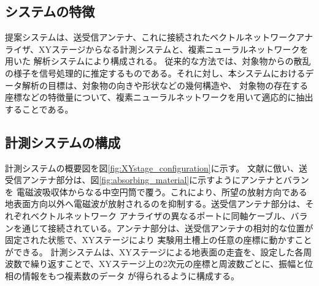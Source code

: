 \documentclass[11pt,a4paper,uplatex,draft]{ujarticle}
\begin{document}
  
  \subsection{システムの特徴}
    
    提案システムは、送受信アンテナ、これに接続されたベクトルネットワークアナライザ、XYステージからなる計測システムと、複素ニューラルネットワークを用いた
    解析システムにより構成される。
    従来的な方法では、対象物からの散乱の様子を信号処理的に推定するものである。それに対し、本システムにおけるデータ解析の目標は、対象物の向きや形状などの幾何構造や、
    対象物の存在する座標などの特徴量について、複素ニューラルネットワークを用いて適応的に抽出することである。

  \subsection{計測システムの構成}

    計測システムの概要図を図\ref{fig:XYstage_configuration}に示す。
    文献\cite{absorbing_material}に倣い、送受信アンテナ部分は、図\ref{fig:absorbing_material}に示すようにアンテナとバランを
    電磁波吸収体からなる中空円筒で覆う。これにより、所望の放射方向である地表面方向以外へ電磁波が放射されるのを抑制する。送受信アンテナ部分は、それぞれベクトルネットワーク
    アナライザの異なるポートに同軸ケーブル、バランを通じて接続されている。アンテナ部分は、送受信アンテナの相対的な位置が固定された状態で、XYステージにより
    実験用土槽上の任意の座標に動かすことができる。
    計測システムは、XYステージによる地表面の走査を、設定した各周波数で繰り返すことで、XYステージ上の2次元の座標と周波数ごとに、振幅と位相の情報をもつ複素数のデータ
    が得られるように構成する。
\end{document}
